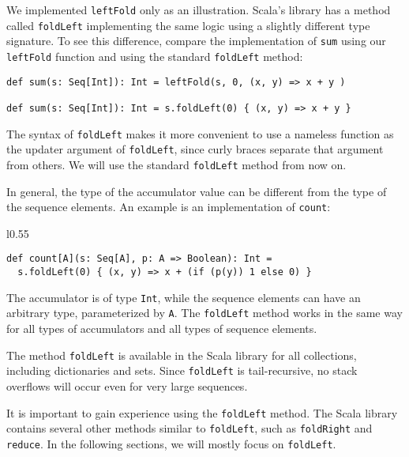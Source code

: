 We implemented \lstinline!leftFold! only as an illustration. Scala\textsf{'}s
library has a method called \lstinline!foldLeft! implementing the
same logic using a slightly different type signature. To see this
difference, compare the implementation of \lstinline!sum! using our
\lstinline!leftFold! function and using the standard \lstinline!foldLeft!
method:
\begin{lstlisting}
def sum(s: Seq[Int]): Int = leftFold(s, 0, (x, y) => x + y )

def sum(s: Seq[Int]): Int = s.foldLeft(0) { (x, y) => x + y }
\end{lstlisting}
The syntax of \lstinline!foldLeft! makes it more convenient to use
a nameless function as the updater argument of \lstinline!foldLeft!,
since curly braces separate that argument from others. We will use
the standard \lstinline!foldLeft! method from now on.

In general, the type of the accumulator value can be different from
the type of the sequence elements. An example is an implementation
of \lstinline!count!:

\begin{wrapfigure}{l}{0.55\columnwidth}%
\vspace{-0.75\baselineskip}
\begin{lstlisting}
def count[A](s: Seq[A], p: A => Boolean): Int =
  s.foldLeft(0) { (x, y) => x + (if (p(y)) 1 else 0) }
\end{lstlisting}

\vspace{-0.9\baselineskip}
\end{wrapfigure}%

\noindent The accumulator is of type \lstinline!Int!, while the sequence
elements can have an arbitrary type, parameterized by \lstinline!A!.
The \lstinline!foldLeft! method works in the same way for all types
of accumulators and all types of sequence elements.

The method \lstinline!foldLeft! is available in the Scala library
for all collections, including dictionaries and sets. Since \lstinline!foldLeft!
is tail-recursive, no stack overflows will occur even for very large
sequences.

It is important to gain experience using the \lstinline!foldLeft!
method. The Scala library contains several other methods similar to
\lstinline!foldLeft!, such as \lstinline!foldRight! and \lstinline!reduce!.
In the following sections, we will mostly focus on \lstinline!foldLeft!.

